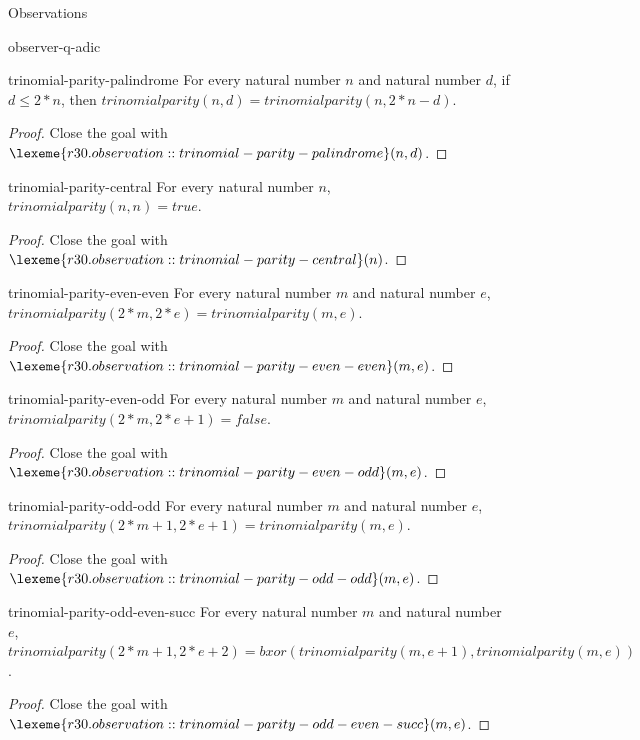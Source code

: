\begin{lexlean}{Observations}
\begin{section}{observer-q-adic}
\begin{theorem}{trinomial-parity-palindrome}
For every natural number \(n\) and natural number \(d\), if \(d ≤ 2 * n\), then \(trinomialparity(n, d) = trinomialparity(n, 2 * n - d)\).
\begin{proof}
Close the goal with \(\lexeme{r30.observation::trinomial-parity-palindrome}(n, d)\).
\end{proof}
\end{theorem}

\begin{theorem}{trinomial-parity-central}
For every natural number \(n\), \(trinomialparity(n, n) = true\).
\begin{proof}
Close the goal with \(\lexeme{r30.observation::trinomial-parity-central}(n)\).
\end{proof}
\end{theorem}

\begin{theorem}{trinomial-parity-even-even}
For every natural number \(m\) and natural number \(e\), \(trinomialparity(2 * m, 2 * e) = trinomialparity(m, e)\).
\begin{proof}
Close the goal with \(\lexeme{r30.observation::trinomial-parity-even-even}(m, e)\).
\end{proof}
\end{theorem}

\begin{theorem}{trinomial-parity-even-odd}
For every natural number \(m\) and natural number \(e\), \(trinomialparity(2 * m, 2 * e + 1) = false\).
\begin{proof}
Close the goal with \(\lexeme{r30.observation::trinomial-parity-even-odd}(m, e)\).
\end{proof}
\end{theorem}

\begin{theorem}{trinomial-parity-odd-odd}
For every natural number \(m\) and natural number \(e\), \(trinomialparity(2 * m + 1, 2 * e + 1) = trinomialparity(m, e)\).
\begin{proof}
Close the goal with \(\lexeme{r30.observation::trinomial-parity-odd-odd}(m, e)\).
\end{proof}
\end{theorem}

\begin{theorem}{trinomial-parity-odd-even-succ}
For every natural number \(m\) and natural number \(e\), \(trinomialparity(2 * m + 1, 2 * e + 2) = bxor(trinomialparity(m, e + 1), trinomialparity(m, e))\).
\begin{proof}
Close the goal with \(\lexeme{r30.observation::trinomial-parity-odd-even-succ}(m, e)\).
\end{proof}
\end{theorem}


\end{section}
\end{lexlean}
